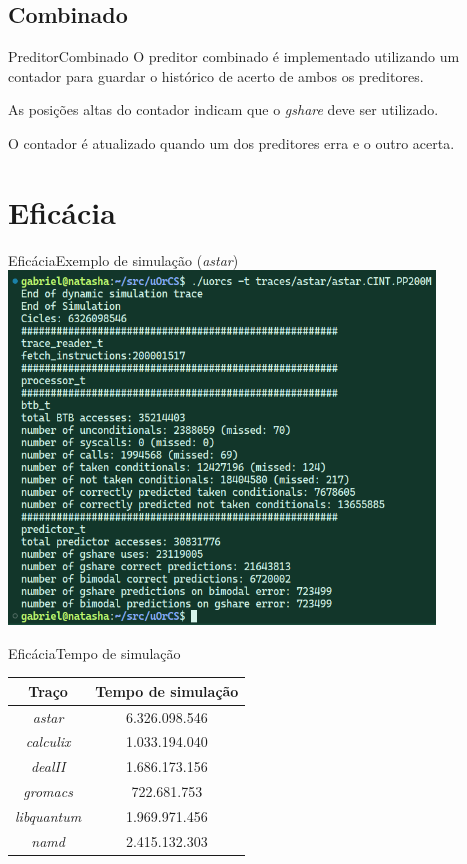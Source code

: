 \documentclass{beamer}
\begin{document}
\subsection{Combinado}

\begin{frame}{Preditor}{Combinado}
	O preditor combinado é implementado utilizando um contador para guardar o
	histórico de acerto de ambos os preditores.

	\vfill

	As posições altas do contador indicam que o \textit{gshare} deve ser
	utilizado.

	\vfill

	O contador é atualizado quando um dos preditores erra e o outro acerta.
\end{frame}

\section{Eficácia}

\begin{frame}{Eficácia}{Exemplo de simulação (\textit{astar})}
	\includegraphics[width=0.85\textwidth]{simulacao.png}
\end{frame}

\begin{frame}{Eficácia}{Tempo de simulação}
	\begin{tabular}{ c|c }
		Traço & Tempo de simulação \\
		\hline
		\textit{astar} & 6.326.098.546 \\
		\textit{calculix} & 1.033.194.040 \\
		\textit{dealII} & 1.686.173.156 \\
		\textit{gromacs} & 722.681.753 \\
		\textit{libquantum} & 1.969.971.456 \\
		\textit{namd} & 2.415.132.303 \\
	\end{tabular}
\end{frame}
\end{document}
